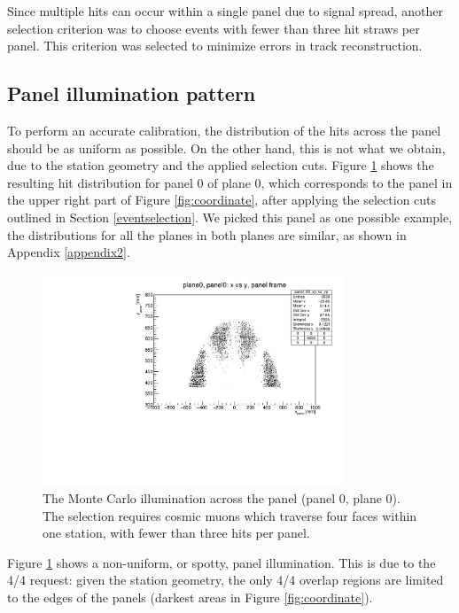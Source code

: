 Since multiple hits can occur within a 
single panel due to signal spread, another 
selection criterion was to choose events 
with fewer than three hit straws per panel. 
This criterion was selected to minimize errors 
in track reconstruction.
\subsection{Panel illumination pattern}
To perform an accurate calibration, 
the distribution of the hits across the panel 
should be as
uniform as possible. On the other hand, this is 
not what we obtain, due to the station geometry
and the applied selection cuts. 
Figure \ref{fig:illumination} shows the 
resulting hit distribution for panel 0 of
plane 0, which corresponds 
to the panel in 
the upper right part of Figure \ref{fig:coordinate}, 
after applying the selection cuts 
outlined in Section 
\ref{eventselection}. 
We picked this panel as one possible 
example, the 
distributions for all the planes in 
both planes are similar, as
shown in Appendix \ref{appendix2}.

\begin{figure}[!h]
    \centering
    \includegraphics[width =0.8\textwidth]{figures/pdf/xp_vs_yp_panel0.pdf}
    \caption[Monte Carlo illumination across 
    the panel (panel 0, plane 0).]{
        The Monte Carlo illumination 
        across the panel (panel 0, plane 0).
        The selection requires cosmic muons which 
        traverse four faces within one station, with 
        fewer than three hits per panel.}
    \label{fig:illumination}
\end{figure}
Figure \ref{fig:illumination} shows a 
non-uniform, or spotty, 
panel illumination. This is due to the 4/4 request: 
given the station geometry, the only 4/4 overlap 
regions are 
limited to the edges of the panels (darkest 
areas in Figure \ref{fig:coordinate}). 


